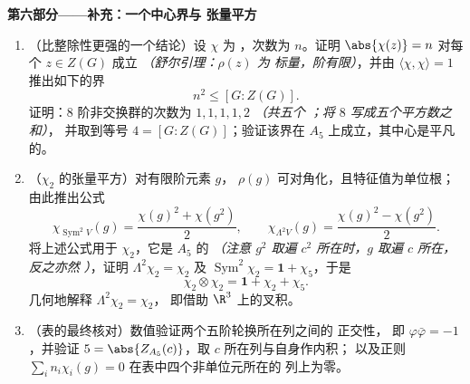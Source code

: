 \begin{problem}
\medskip
    \noindent\textbf{第六部分——补充：一个中心界与
张量平方}
\begin{enumerate}[resume]
  \item （比整除性更强的一个结论）设 $\chi$ 为
        ，次数为 $n$。证明 $\abs{\chi(z)} = n$ 对每个
        $z \in Z(G)$ 成立 \emph{（舒尔引理：$\rho(z)$ 为
        标量，阶有限）}，并由
        $\langle\chi, \chi\rangle = 1$ 推出如下的界
        \[
        n^2 \leq [G : Z(G)] .
        \]
        证明：$8$ 阶非交换群的次数为
        $1, 1, 1, 1, 2$ \emph{（共五个
        ；将 $8$ 写成五个平方数之和）}，
        并取到等号 $4 = [G : Z(G)]$；验证该界在
        $A_5$ 上成立，其中心是平凡的。
  \item （$\chi_2$ 的张量平方）对有限阶元素 $g$，
        $\rho(g)$ 可对角化，且特征值为单位根；
        由此推出公式
        \[
        \chi_{\operatorname{Sym}^2 V}(g)
        = \frac{\chi(g)^2 + \chi(g^2)}2,
        \qquad
        \chi_{\Lambda^2 V}(g)
        = \frac{\chi(g)^2 - \chi(g^2)}2 .
        \]
        将上述公式用于 $\chi_2$，它是 $A_5$ 的 \emph{（注意 $g^2$
        取遍 $c^2$ 所在时，$g$ 取遍 $c$ 所在，反之亦然
        ）}，证明 $\Lambda^2\chi_2 =
        \chi_2$ 及 $\operatorname{Sym}^2\chi_2 = \mathbf 1 +
        \chi_5$，于是
        \[
        \chi_2\otimes\chi_2 = \mathbf 1 + \chi_2 + \chi_5 .
        \]
        几何地解释 $\Lambda^2\chi_2 = \chi_2$，
        即借助 $\R^3$ 上的叉积。
  \item （表的最终核对）数值验证两个五阶轮换所在列之间的
        正交性，
        即 $\varphi\bar\varphi = -1$，并验证 $5 =
        \abs{Z_{A_5}(c)}$，取 $c$ 所在列与自身作内积；
        以及正则 $\sum_i
        n_i\chi_i(g) = 0$ 在表中四个非单位元所在的
        列上为零。
\end{enumerate}
\end{problem}
